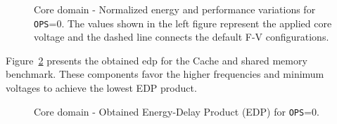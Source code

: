 \begin{figure}[!htb]
  \begin{subfigmatrix}{2}
  \end{subfigmatrix}
  \caption{Core domain - Normalized energy and performance variations for \texttt{OPS}=0. The  values shown in the left figure represent the applied core voltage and the dashed line connects the default F-V configurations.}
  \label{fig:cache_sm_behaviour}
\end{figure}


Figure~\ref{fig:cache_sm_edp} presents the obtained \acrshort{edp} for the Cache and shared memory benchmark. These components favor the higher frequencies and minimum voltages to achieve the lowest EDP product.

\begin{figure}[!htb]
  \begin{subfigmatrix}{2}
  \end{subfigmatrix}
  \caption{Core domain - Obtained Energy-Delay Product (EDP) for \texttt{OPS}=0.}
  \label{fig:cache_sm_edp}
\end{figure}



